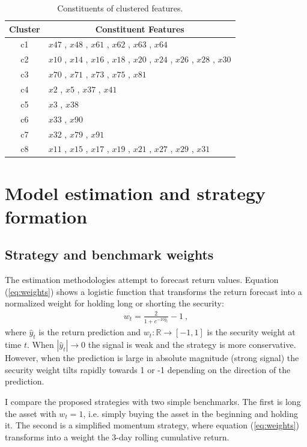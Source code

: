 \documentclass[12pt]{article}
\begin{document}
\begin{table}[ht]
\centering\small
\caption{Constituents of clustered features.}
\label{tab:clusters}
\begin{tabular}{cl}
\toprule
Cluster	&	\multicolumn{1}{c}{Constituent Features} \\ \midrule
c1	&	$x47$	,	$x48$	,	$x61$	,	$x62$	,	$x63$	,	$x64$	\\
c2	&	$x10$	,	$x14$	,	$x16$	,	$x18$	,	$x20$	,	$x24$	,	$x26$	,	$x28$	,	$x30$	\\
c3	&	$x70$	,	$x71$	,	$x73$	,	$x75$	,	$x81$	\\
c4	&	$x2$	,	$x5$	,	$x37$	,	$x41$		\\
c5	&	$x3$	,	$x38$	\\
c6	&	$x33$	,	$x90$	\\
c7	&	$x32$	,	$x79$	,	$x91$	\\
c8	&	$x11$	,	$x15$	,	$x17$	,	$x19$	,	$x21$	,	$x27$	,	$x29$	,	$x31$		\\
\bottomrule
\end{tabular}
\end{table}


\section{Model estimation and strategy formation}

\subsection{Strategy and benchmark weights}

The estimation methodologies attempt to forecast return values. Equation (\ref{eq:weights}) shows a logistic function that transforms the return forecast into a normalized weight for holding long or shorting the security:
\begin{align}
	w_t = \frac{2}{1+e^{-10\hat y_t}} - 1 \ ,
	\label{eq:weights}
\end{align}
where $\hat y_t$ is the return prediction and $w_t:\mathbb{R}\rightarrow[-1,1]$ is the security weight at time $t$. When $|\hat y_t|\rightarrow 0$ the signal is weak and the strategy is more conservative. However, when the prediction is large in absolute magnitude (strong signal) the security weight tilts rapidly towards 1 or -1 depending on the direction of the prediction.

I compare the proposed strategies with two simple benchmarks. The first is long the asset with $w_t=1$, i.e. simply buying the asset in the beginning and holding it. The second is a simplified momentum strategy, where equation (\ref{eq:weights}) transforms into a weight the 3-day rolling cumulative return.
\end{document}
